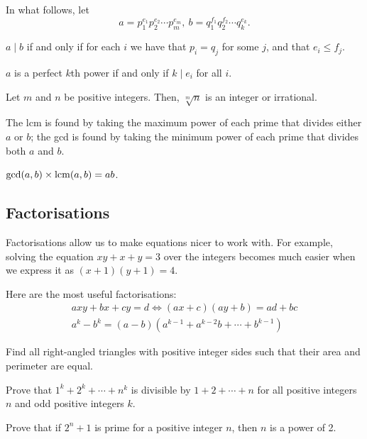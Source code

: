 In what follows, let 
\[a=p_1^{e_1}p_2^{e_2}\cdots p_m^{e_m},\
      b=q_1^{f_1}q_2^{f_2}\cdots q_k^{e_k}.\]
\begin{result}{\label{r:b:n:p:2}}
    $a\mid b$ if and only if for each $i$ we have that $p_i=q_j$
      for some $j$, and that $e_i\le f_j$.
\end{result}
\begin{result}{\label{r:b:n:p:3}}
    $a$ is a perfect $k$th power if and only if $k\mid e_i$ for all $i$.
\end{result}
\begin{result}{\label{r:b:n:d:3}}
    Let $m$ and $n$ be positive integers. Then, $\sqrt[m]n$ is an integer or
    irrational.
\end{result}
\begin{result}{\label{r:b:n:p:4}}
    The lcm is found by taking the maximum power of each prime that
    divides either $a$ or $b$; the gcd is found by taking the minimum power of
    each prime that divides both $a$ and $b$.
\end{result}
\begin{result}{\label{r:b:n:p:5}}
    $\gcd(a,b)\times\mathrm{lcm}(a,b)=ab$.
\end{result}
\subsection{Factorisations}
Factorisations allow us to make equations nicer to work with. For example,
solving the equation $xy+x+y=3$ over the integers becomes much easier when we
express it as $(x+1)(y+1)=4$.

Here are the most useful factorisations:
\begin{align*}
  axy+bx+cy=d\iff (ax+c)(ay+b)=ad+bc \\
  a^k-b^k=(a-b)\left(a^{k-1}+a^{k-2}b+\cdots+b^{k-1}\right)
\end{align*}
\begin{problem}{\label{p:b:n:f:1}}
     Find all right-angled triangles with positive integer sides 
      such that their area and perimeter are equal.
\end{problem}
\begin{problem}{\label{p:b:n:f:2}}
     Prove that $1^k+2^k+\cdots+n^k$ is divisible by $1+2+\cdots+n$ for
      all positive integers $n$ and odd positive integers $k$.
\end{problem}
\begin{problem}{\label{p:b:n:f:3}}
    Prove that if $2^n+1$ is prime for a positive integer $n$, then $n$ is
      a power of 2.
\end{problem}
